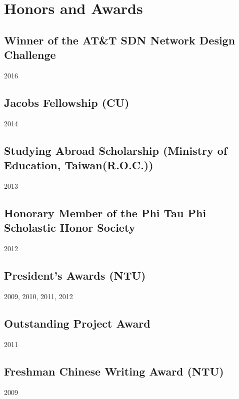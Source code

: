 \section{Honors and Awards}
\subsection{Winner of the AT\&T SDN Network Design Challenge}{}{2016}
\\[-1pt]
\subsection{Jacobs Fellowship (CU)}{}{2014}
\subsection{Studying Abroad Scholarship (Ministry of Education, Taiwan(R.O.C.))}{}{2013}
\subsection{Honorary Member of the Phi Tau Phi Scholastic Honor Society}{}{2012}
\\[-1pt]
\subsection{President's Awards (NTU)}{}{2009, 2010, 2011, 2012}
\\[-1pt]
\subsection{Outstanding Project Award}{}{2011}
\\[-1pt]
\ifdetail%
\subsection{Freshman Chinese Writing Award (NTU)}{}{2009}
\fi%
\vspace*{0.1cm}